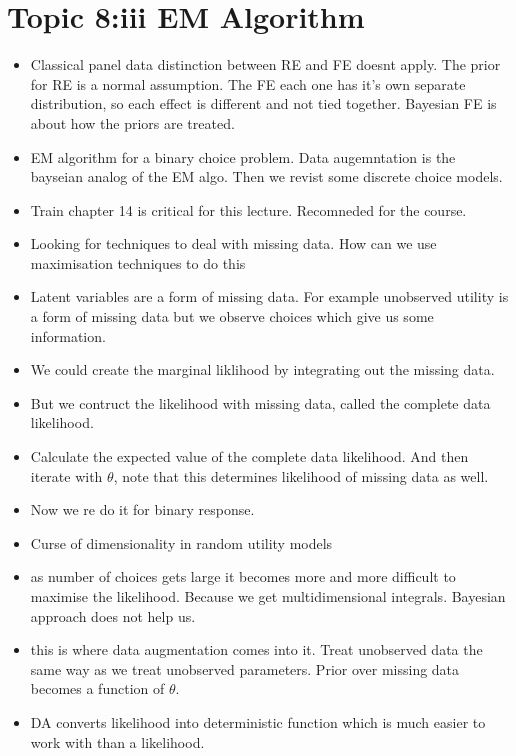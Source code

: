 \documentclass[12pt]{article}
\begin{document}
\section*{Topic 8:iii EM Algorithm}
\begin{itemize}
      \item Classical panel data distinction between RE and FE doesnt apply. The prior
            for RE is a normal assumption. The FE each one has it's own separate distribution, so each effect
            is different and not tied together. Bayesian FE is about how the priors are treated.

      \item EM algorithm for a binary choice problem. Data augemntation is the bayseian analog of the
            EM algo. Then we revist some discrete choice models.

      \item Train chapter 14 is critical for this lecture. Recomneded for the course.
      \item Looking for techniques to deal with missing data. How can we use maximisation techniques to do this
      \item Latent variables are a form of missing data. For example unobserved utility is a form of missing data but
            we observe choices which give us some information.

      \item We could create the marginal liklihood by integrating out the missing data.
      \item But we contruct the likelihood with missing data, called the complete data likelihood.

      \item Calculate the expected value of the complete data likelihood. And then iterate
            with $\theta$, note that this determines likelihood of missing data as well.

      \item Now we re do it for binary response.
      \item Curse of dimensionality in random utility models
      \item as number of choices gets large it becomes more and more difficult to maximise
            the likelihood. Because we get multidimensional integrals. Bayesian approach does not help us.

      \item this is where data augmentation comes into it. Treat unobserved data the same way as we treat
            unobserved parameters. Prior over missing data becomes a function of $\theta$.
      \item DA converts likelihood into deterministic function which is much easier to work with than a
            likelihood.


\end{itemize}
\end{document}
